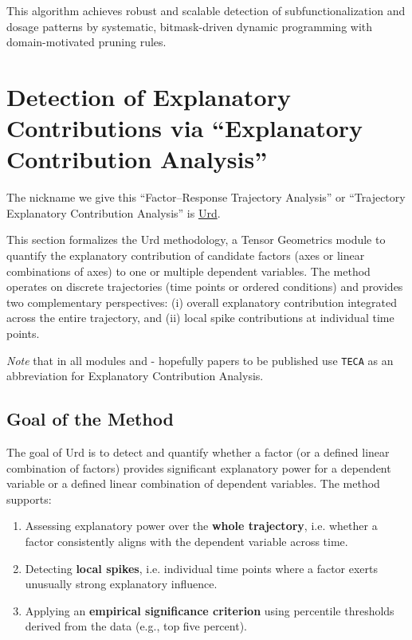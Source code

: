 \documentclass{article}
\begin{document}
\noindent
This algorithm achieves robust and scalable detection of subfunctionalization and dosage patterns by systematic, bitmask-driven dynamic programming with domain-motivated pruning rules.

\section{Detection of Explanatory Contributions via ``Explanatory Contribution Analysis''}

The nickname we give this ``Factor–Response Trajectory Analysis'' or
``Trajectory Explanatory Contribution Analysis'' is
\href{https://en.wikipedia.org/wiki/Ur\%C3\%B0r}{Urd}.

This section formalizes the Urd methodology, a Tensor Geometrics module to quantify the explanatory contribution of candidate factors (axes or linear combinations of axes) to one or multiple dependent variables. The method operates on discrete trajectories (time points or ordered conditions) and provides two complementary perspectives: (i) overall explanatory contribution integrated across the entire trajectory, and (ii) local spike contributions at individual time points.

\emph{Note} that in all modules and - hopefully papers to be published use
\texttt{TECA} as an abbreviation for Explanatory Contribution Analysis.

\subsection{Goal of the Method}

The goal of Urd is to detect and quantify whether a factor (or a defined linear combination of factors) provides significant explanatory power for a dependent variable or a defined linear combination of dependent variables. The method supports:
\begin{enumerate}
    \item Assessing explanatory power over the \textbf{whole trajectory}, i.e. whether a factor consistently aligns with the dependent variable across time.
    \item Detecting \textbf{local spikes}, i.e. individual time points where a factor exerts unusually strong explanatory influence.
    \item Applying an \textbf{empirical significance criterion} using percentile thresholds derived from the data (e.g., top five percent).
\end{enumerate}
\end{document}

